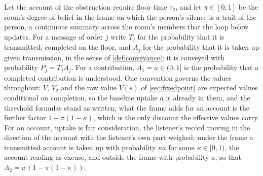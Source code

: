 Let the account of the obstruction require floor time $\tau_2$, and let $\pi \in [0,1]$ be the room's degree of belief in the frame on which the person's silence is a trait of the person, a continuous summary across the room's members that the loop below updates. For a message of order $j$ write $T_j$ for the probability that it is transmitted, completed on the floor, and $A_j$ for the probability that it is taken up given transmission, in the sense of \autoref{def:conveyance}; it is conveyed with probability $P_j = T_j A_j$. For a contribution, $A_1 = a \in (0,1]$ is the probability that a completed contribution is understood. One convention governs the values throughout: $V$, $V_2$ and the raw value $V(s)$ of \autoref{sec:fixedpoint} are expected values conditional on completion, so the baseline uptake $a$ is already in them, and the threshold formulas stand as written; what the frame adds for an account is the further factor $1 - \pi(1-\kappa)$, which is the only discount the effective values carry. For an account, uptake is fair consideration, the listener's record moving in the direction of the account with the listener's own part weighed; under the frame a transmitted account is taken up with probability $\kappa a$ for some $\kappa \in [0,1)$, the account reading as excuse, and outside the frame with probability $a$, so that $A_2 = a\,(1 - \pi(1-\kappa))$.

